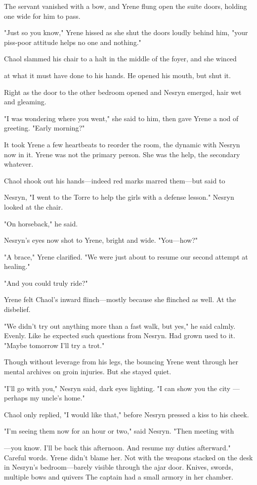 The servant vanished with a bow, and Yrene flung open the suite doors, holding one wide for him to pass.

"Just so you know," Yrene hissed as she shut the doors loudly behind him, "your piss-poor attitude helps no one and nothing."

Chaol slammed his chair to a halt in the middle of the foyer, and she winced

at what it must have done to his hands. He opened his mouth, but shut it.

Right as the door to the other bedroom opened and Nesryn emerged, hair wet and gleaming.

"I was wondering where you went," she said to him, then gave Yrene a nod of greeting. "Early morning?"

It took Yrene a few heartbeats to reorder the room, the dynamic with Nesryn now in it. Yrene was not the primary  person. She was the help, the secondary  whatever.

Chaol shook out his hands---indeed red marks marred them---but said to

Nesryn, "I went to the Torre to help the girls with a defense lesson." Nesryn looked at the chair.

"On horseback," he said.

Nesryn's eyes now shot to Yrene, bright and wide. "You---how?"

"A brace," Yrene clarified. "We were just about to resume our second attempt at healing."

"And you could truly ride?"

Yrene felt Chaol's inward flinch---mostly because she flinched as well. At the disbelief.

"We didn't try out anything more than a fast walk, but yes," he said calmly. Evenly. Like he expected such questions from Nesryn. Had grown used to it. "Maybe tomorrow I'll try a trot."

Though without leverage from his legs, the bouncing  Yrene went through her mental archives on groin injuries. But she stayed quiet.

"I'll go with you," Nesryn said, dark eyes lighting. "I can show you the city ---perhaps my uncle's home."

Chaol only replied, "I would like that," before Nesryn pressed a kiss to his cheek.

"I'm seeing them now for an hour or two," said Nesryn. "Then meeting with

---you know. I'll be back this afternoon. And resume my  duties afterward." Careful words. Yrene didn't blame her. Not with the weapons stacked on the desk in Nesryn's bedroom---barely visible through the ajar door. Knives, swords, multiple bows and quivers  The captain had a small armory in her chamber.

